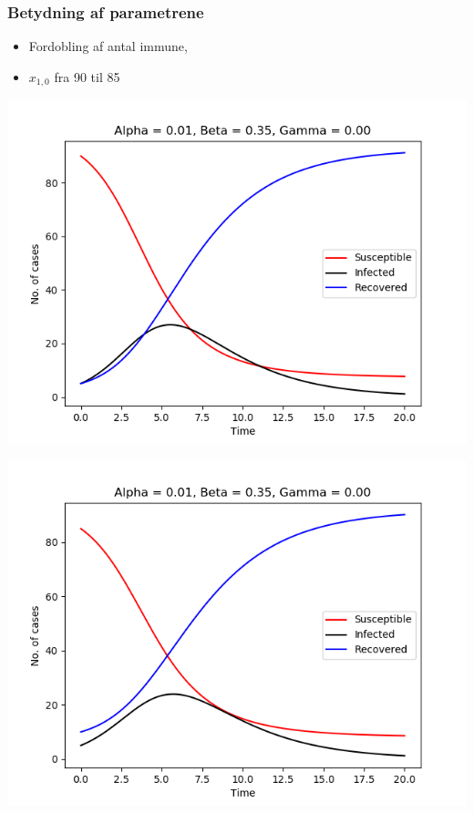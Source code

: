 \begin{frame}
\frametitle{Betydning af parametrene}
\begin{itemize}
\item Fordobling af antal immune, 
\item $x_{1,0}$ fra 90 til 85
\end{itemize}

\begin{minipage}{0.49\textwidth}
\includegraphics[scale=0.3]{fig/img/t_a1_b35_g0.png}
\end{minipage}
%
\begin{minipage}{0.49\textwidth}
\includegraphics[scale=0.3]{fig/img/t_x1_5_x2_85.png}
\end{minipage}
\end{frame}
